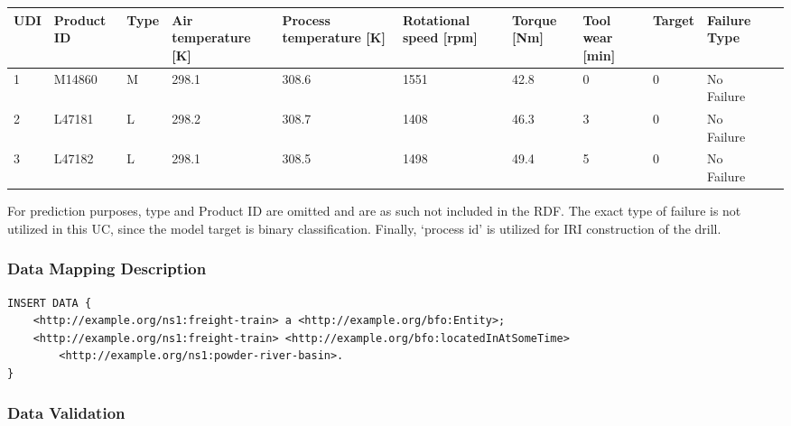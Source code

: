 \begin{tabularx}{\textwidth}{|l|X|X|X|X|X|X|X|X|X|X|}
\hline
UDI & Product ID & Type & Air temperature {[}K{]} & Process temperature {[}K{]} & Rotational speed {[}rpm{]} & Torque {[}Nm{]} & Tool wear {[}min{]} & Target & Failure Type \\ \hline
1   & M14860     & M    & 298.1                   & 308.6                       & 1551                       & 42.8            & 0                   & 0      & No Failure   \\
2   & L47181     & L    & 298.2                   & 308.7                       & 1408                       & 46.3            & 3                   & 0      & No Failure   \\
3   & L47182     & L    & 298.1                   & 308.5                       & 1498                       & 49.4            & 5                   & 0      & No Failure   \\ \hline
\end{tabularx}

For prediction purposes, type and Product ID are omitted and are as such not included in the RDF. The exact type of failure is not utilized in this UC, since the model target is binary classification. Finally, `process id' is utilized for IRI construction of the drill.

\subsubsection*{Data Mapping Description}

\begin{verbatim}
INSERT DATA {
    <http://example.org/ns1:freight-train> a <http://example.org/bfo:Entity>;
    <http://example.org/ns1:freight-train> <http://example.org/bfo:locatedInAtSomeTime> 
        <http://example.org/ns1:powder-river-basin>.
}
\end{verbatim}

\subsubsection*{Data Validation}